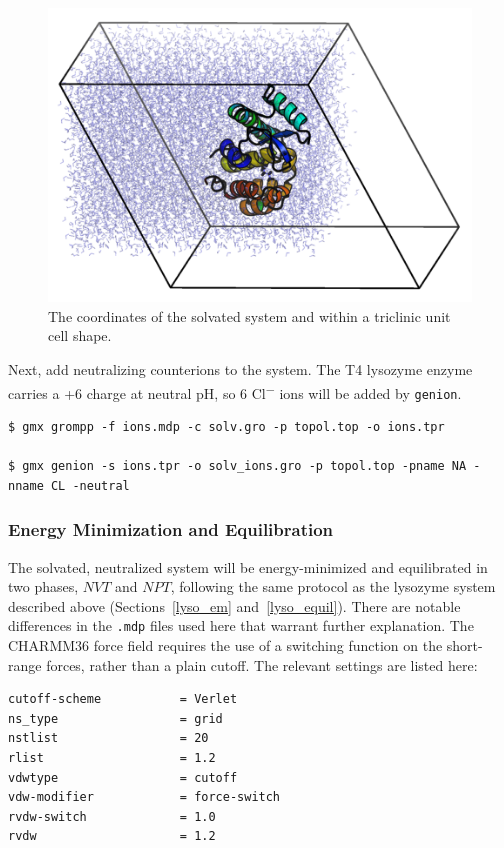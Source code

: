 \documentclass[9pt,tutorial,pubversion]{livecoms}
\begin{document}
\begin{figure}[h!]
\centering
\includegraphics{3htb_unit_cell}
\caption{The coordinates of the solvated system and within a triclinic unit cell shape.}
\label{3htb_unit_cell_fig}
\end{figure}

Next, add neutralizing counterions to the system. The T4 lysozyme enzyme carries a +6 charge at neutral pH, so 6 Cl\textsuperscript{$-$} ions will be added by \texttt{genion}.

\begin{lstlisting}
$ gmx grompp -f ions.mdp -c solv.gro -p topol.top -o ions.tpr

$ gmx genion -s ions.tpr -o solv_ions.gro -p topol.top -pname NA -nname CL -neutral
\end{lstlisting}

\subsubsection{Energy Minimization and Equilibration} \label{complex_em_eq}

The solvated, neutralized system will be energy-minimized and equilibrated in two phases, $NVT$ and $NPT$, following the same protocol as the lysozyme system described above (Sections~\ref{lyso_em} and~\ref{lyso_equil}). There are notable differences in the \texttt{.mdp} files used here that warrant further explanation. The CHARMM36 force field requires the use of a switching function on the short-range forces, rather than a plain cutoff. The relevant settings are listed here:

\begin{lstlisting}
cutoff-scheme           = Verlet
ns_type                 = grid
nstlist                 = 20
rlist                   = 1.2
vdwtype                 = cutoff
vdw-modifier            = force-switch
rvdw-switch             = 1.0
rvdw                    = 1.2
\end{lstlisting}
\end{document}
